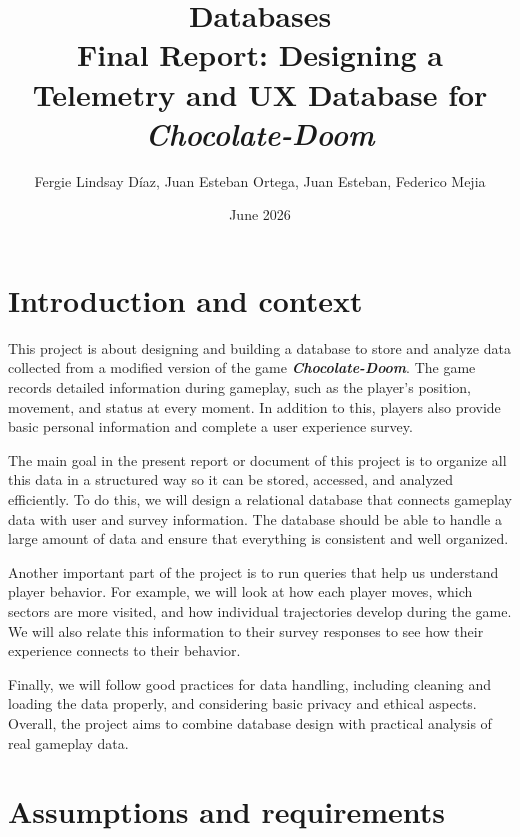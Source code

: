 \documentclass[11pt]{article}
\title{Databases\\\textbf{Final Report: Designing a Telemetry and UX Database for \textit{Chocolate-Doom}}}
\author{Fergie Lindsay D\'iaz, Juan Esteban Ortega, Juan Esteban, Federico Mejia}
\date{June 2026}
\begin{document}
\maketitle
\tableofcontents
\clearpage

\section{Introduction and context} 

This project is about designing and building a database to store and analyze data collected from a modified version of the game \textit{\textbf{Chocolate-Doom}}. The game records detailed information during gameplay, such as the player’s position, movement, and status at every moment. In addition to this, players also provide basic personal information and complete a user experience survey. 

\medskip The main goal in the present report or document of this project is to organize all this data in a structured way so it can be stored, accessed, and analyzed efficiently. To do this, we will design a relational database that connects gameplay data with user and survey information. The database should be able to handle a large amount of data and ensure that everything is consistent and well organized. 

\medskip Another important part of the project is to run queries that help us understand player behavior. For example, we will look at how each player moves, which sectors are more visited,
and how individual trajectories develop during the game. We will also relate this information to their survey responses to see how their experience connects to their behavior. 

\medskip Finally, we will follow good practices for data handling, including cleaning and loading the data properly, and considering basic privacy and ethical aspects. Overall, the project aims to combine database design with practical analysis of real gameplay data.



\section{Assumptions and requirements}
\end{document}
